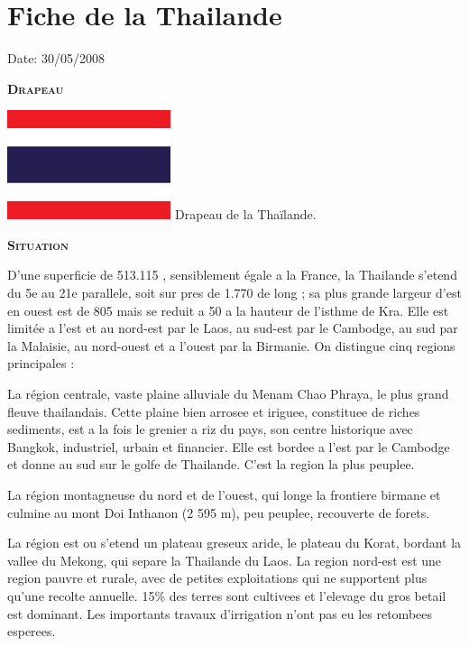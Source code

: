 \section{Fiche de la Thailande}

Date: 30/05/2008

\begin{multicols}{2}

\textbf{\textsc{Drapeau}}

\hspace*{-0.65cm}
\includegraphics[width=4.8cm]{articles/Fiche-de-la-thailande/drapeau_thailande.png}
Drapeau de la Thaïlande.

\textbf{\textsc{Situation}}

D’une superficie de 513.115 \kilo\meter\squared, sensiblement égale a la France, la Thailande s’etend du 5e au 21e parallele, soit sur pres de 1.770 \kilo\meter de long ; sa plus grande largeur d’est en ouest est de 805 \kilo\meter mais se reduit a 50 \kilo\meter a la hauteur de l’isthme de Kra.
Elle est limitée a l’est et au nord-est par le Laos, au sud-est par le Cambodge, au sud par la Malaisie, au nord-ouest et a l’ouest par la Birmanie. On distingue cinq regions principales :

La région centrale, vaste plaine alluviale du Menam Chao Phraya, le plus grand fleuve thailandais. Cette plaine bien arrosee et iriguee, constituee de riches sediments, est a la fois le grenier a riz du pays, son centre historique avec Bangkok, industriel, urbain et financier. Elle est bordee a l’est par le Cambodge et donne au sud sur le golfe de Thailande. C’est la region la plus peuplee.

La région montagneuse du nord et de l’ouest, qui longe la frontiere birmane et culmine au mont Doi Inthanon (2 595 m), peu peuplee, recouverte de forets.

La région est ou s’etend un plateau greseux aride, le plateau du Korat, bordant la vallee du Mekong, qui separe la Thailande du Laos. La region nord-est est une region pauvre et rurale, avec de petites exploitations qui ne supportent plus qu’une recolte annuelle. 15\% des terres sont cultivees et l’elevage du gros betail est dominant. Les importants travaux d’irrigation n’ont pas eu les retombees esperees.


\end{multicols}
